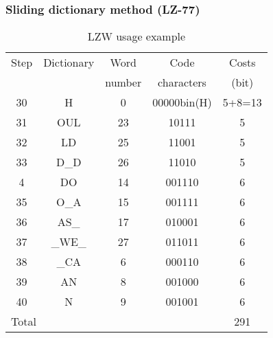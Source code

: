 \documentclass[14pt]{beamer}
\begin{document}
\begin{frame}
\frametitle{Sliding dictionary method (LZ-77)}   

    \begin{table}[htbp]
    \begin{center}
    \caption{LZW usage example}
    \scalebox{0.7} {
    \begin{tabular}
    {|c|c|c|c|c|} \hline %
    Step& Dictionary& Word & Code & Costs \\
       &        & number & characters& (bit) \\\hline%
    30& H& 0& 00000bin(H)&5+8=13 \\\hline%
    31& OUL& 23& 10111& 5 \\\hline%
    32&LD& 25& 11001&5 \\\hline%
    33& D{\_}D& 26& 11010&5 \\\hline%
    4& DO& 14& 001110&6 \\\hline%
    35& O{\_}A& 15& 001111&6 \\\hline%
    36&AS{\_}& 17& 010001&6 \\\hline%
    37&{\_}WE{\_}& 27& 011011&6 \\\hline%
    38&{\_}CA& 6& 000110&6 \\\hline%
    39&AN& 8& 001000&6 \\\hline%
    40&N& 9& 001001&6 \\\hline%
    \multicolumn{4}{|l|}{Total} &
    291 \\
    \hline
    \end{tabular}
    }
    \end{center}
    \end{table}

\end{frame}


\end{document}
